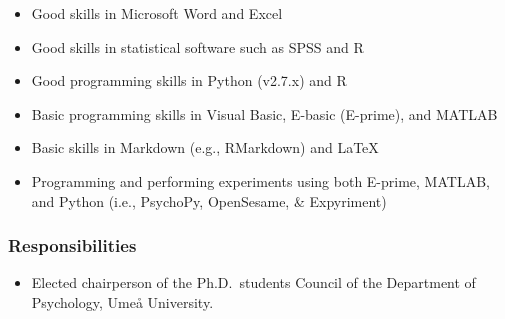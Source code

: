 \documentclass[]{article}
\providecommand{\tightlist}{%
  \setlength{\itemsep}{0pt}\setlength{\parskip}{0pt}}
\begin{document}
\begin{itemize}
\tightlist
\item
  Good skills in Microsoft Word and Excel
\item
  Good skills in statistical software such as SPSS and R
\item
  Good programming skills in Python (v2.7.x) and R
\item
  Basic programming skills in Visual Basic, E-basic (E-prime), and
  MATLAB
\item
  Basic skills in Markdown (e.g., RMarkdown) and \LaTeX
\item
  Programming and performing experiments using both E-prime, MATLAB, and
  Python (i.e., PsychoPy, OpenSesame, \& Expyriment)
\end{itemize}

\subsubsection{Responsibilities}\label{responsibilities}

\begin{itemize}
\tightlist
\item
  Elected chairperson of the Ph.D.~students Council of the Department of
  Psychology, Umeå University.
\end{itemize}

\begin{landscape}
\pagestyle{style2}




\end{landscape}
\end{document}
